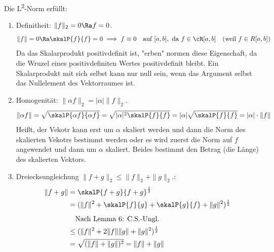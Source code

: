 \begin{bemerkungbox}
    Die L\textsuperscript{2}-Norm erfüllt:
    \begin{enumerate}
        \item Definitheit: $\|f\|_2 = 0 \Ra f = 0$.
        $$
            \lVert f \rVert = 0 \Ra \skalP{f}{f} = 0 \implies f \equiv 0 \quad \text{auf } [a,b], \text{ da } f\in \cR[a,b] \quad
            (\text{weil } f \in R[a,b])
        $$
        Da das Skalarprodukt positivdefinit ist, "erben" normen diese Eigenschaft, da die Wruzel eines positivdefiniten Wertes positivdefinit bleibt. Ein Skalarprodukt mit sich selbst kann nur null sein, wenn das Argument selbst das Nullelement des Vektorraumes ist.

        \item Homogenität: $\|\alpha f\|_2 = |\alpha|\|f\|_2$.
        $$
            \lVert \alpha f \rVert = \sqrt{\skalP{\alpha f}{\alpha f}}\\
            = \sqrt{\lvert \alpha \rvert^2 \skalP{f}{f}} = \lvert \alpha \rvert \sqrt{\skalP{f}{f}} = \lvert \alpha \rvert \cdot \lVert f \rVert\\[0.5em]
        $$
        Heißt, der Vekotr kann erst um $\alpha$ skaliert werden und dann die Norm des skalierten Vekotrs bestimmt werden oder es wird zuerst die Norm auf $f$ angewendet und dann um $\alpha$ skaliert. Beides bestimmt den Betrag (die Länge) des skalierten Vektors.

        \item Dreiecksungleichung $\|f+g\|_2 \le \|f\|_2 + \|g\|_2$.:
        $$
            \begin{aligned}
                \lVert f + g \rVert &= \skalP{f+g}{f+g}^{\frac{1}{2}} \\
                & = (\lVert f \rVert^2 + \skalP{f}{g} + \skalP{g}{f} + \lVert g \rVert^2)^{\frac{1}{2}} \\[0.5em]
                & \quad \text{Nach Lemma 6: C.S.-Ungl.} \\
                &\leq   (\lVert f \rVert^2 + 2 \lVert f \rVert \lVert g \rVert + \lVert g \rVert^2)^{\frac{1}{2}}\\
                & = \sqrt{(\lVert f \rVert + \lVert g \rVert)^2} = \lVert f \rVert + \lVert g \rVert
            \end{aligned}
        $$
        \end{enumerate}
\end{bemerkungbox}


